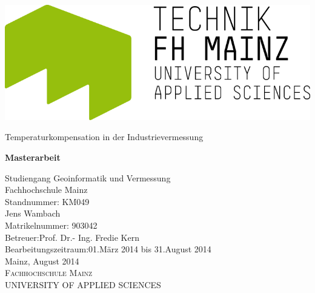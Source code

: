 \begin{titlepage}
\clearscrheadings\clearscrplain

\begin{center}
\includegraphics[scale=0.5]{bilder/FHM_T_CO.png} 
\end{center}

\begin{center}
\begin{Huge}
Temperaturkompensation in der Industrievermessung\\
\end{Huge}
\vspace{20mm}
\begin{Large}
\textbf{Masterarbeit}\\
\end{Large}
\vspace{8mm}
Studiengang Geoinformatik und Vermessung\\
\vspace{0.4cm}
Fachhochschule Mainz\\
\vspace{10mm}
Standnummer: KM049 \\
\vspace{10mm}
Jens Wambach\\
Matrikelnummer: 903042\\
\vspace{15mm}
Betreuer:\hfill Prof. Dr.- Ing. Fredie Kern\\
\vspace{8mm}
Bearbeitungszeitraum:\hfill 01.März 2014 bis 31.August 2014\\
\vspace{10mm}
Mainz, August 2014\\
	\vspace{5mm}
	\normalsize
	\textsc{Fachhochschule Mainz\\
	UNIVERSITY OF APPLIED SCIENCES}\\
\end{center}
\clearpage

\end{titlepage}